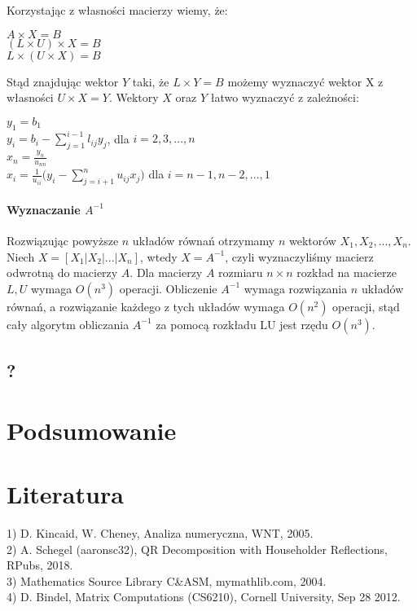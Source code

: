 \documentclass[11pt]{article}
\begin{document}
Korzystając z własności macierzy wiemy, że:
\begin{center}
$A \times X = B$ \\
$(L \times U) \times X = B$ \\
$L \times (U \times X) = B$
\end{center}
Stąd znajdując wektor $Y$ taki, że $L \times Y = B$ możemy wyznaczyć wektor X z własności $U \times X = Y$. Wektory $X$ oraz $Y$ łatwo wyznaczyć z zależności:
\begin{center}
$y_{1} = b_{1}$\\
\vspace{0.3em} $y_{i} = b_{i} - \sum_{j=1}^{i-1} l_{ij} y_{j}$, dla $i = 2,3,...,n$\\
\vspace{0.3em} $x_{n} = \frac{y_{n}}{u_{nn}}$\\
\vspace{0.3em} $x_{i} = \frac{1}{u_{ii}} \Big( y_{i} - \sum_{j=i+1}^{n} u_{ij} x_{j} \Big)$ dla $i = n-1,n-2,...,1$
\end{center}

\paragraph{Wyznaczanie $A^{-1}$}
Rozwiązując powyższe $n$ układów równań otrzymamy $n$ wektorów $X_{1}, X_{2},..., X_{n}$. Niech $X = [ X_{1} \vert X_{2} \vert ... \vert X_{n} ]$, wtedy $X = A^{-1}$, czyli wyznaczyliśmy macierz odwrotną do macierzy $A$. Dla macierzy $A$ rozmiaru $n \times n$ rozkład na macierze $L, U$ wymaga $O(n^{3})$ operacji. Obliczenie $A^{-1}$ wymaga rozwiązania $n$ układów równań, a rozwiązanie każdego z tych układów wymaga $O(n^{2})$ operacji, stąd cały algorytm obliczania $A^{-1}$ za pomocą rozkładu LU jest rzędu $O(n^{3})$.
\subsection{?}

\section{Podsumowanie}

\section{Literatura}

1) D. Kincaid, W. Cheney, Analiza numeryczna, WNT, 2005.\\
2) A. Schegel (aaronsc32), QR Decomposition with Householder Reflections, RPubs, 2018.\\
3) Mathematics Source Library C\&ASM, mymathlib.com, 2004.\\
4) D. Bindel, Matrix Computations (CS6210), Cornell University, Sep 28 2012.\\ 


	 
\end{document}
